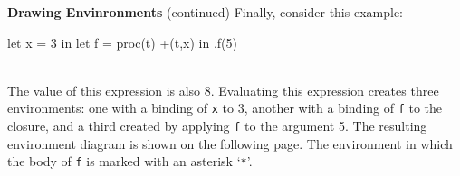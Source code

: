 \begin{minipage}[t]{\sw}
\slidenumber
\LARGE
{\bf Drawing Envinronments} (continued)\exx
Finally, consider this example:\\[1.5ex]
\Large
\begin{verbbox}
let
  x = 3
in
  let
    f = proc(t) +(t,x)
  in
    .f(5)
\end{verbbox}
\emm\theverbbox\\[1.5ex]
\LARGE
The value of this expression is also 8.
Evaluating this expression creates three environments:
one with a binding of \verb'x' to 3,
another with a binding of \verb'f' to the closure,
and a third created by applying \verb'f' to the argument 5.
The resulting environment diagram is shown
on the following page.
The environment in which the body of \verb'f'
is marked with an asterisk `\verb'*''.
\end{minipage}
